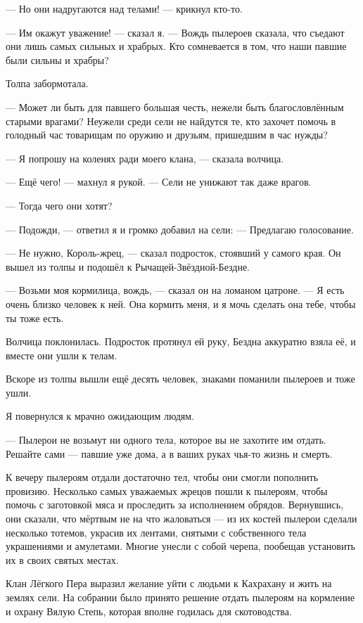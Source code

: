 --- Но они надругаются над телами! --- крикнул кто-то.

--- Им окажут уважение! --- сказал я.
--- Вождь пылероев сказала, что съедают они лишь самых сильных и храбрых.
Кто сомневается в том, что наши павшие были сильны и храбры?

Толпа забормотала.

--- Может ли быть для павшего большая честь, нежели быть благословлённым старыми врагами?
Неужели среди сели не найдутся те, кто захочет помочь в голодный час товарищам по оружию и друзьям, пришедшим в час нужды?

--- Я попрошу на коленях ради моего клана, --- сказала волчица.

--- Ещё чего! --- махнул я рукой.
--- Сели не унижают так даже врагов.

--- Тогда чего они хотят?

--- Подожди, --- ответил я и громко добавил на сели:
--- Предлагаю голосование.

--- Не нужно, Король-жрец, --- сказал подросток, стоявший у самого края.
Он вышел из толпы и подошёл к Рычащей-Звёздной-Бездне.

--- Возьми моя кормилица, вождь, --- сказал он на ломаном цатроне.
--- Я есть очень близко человек к ней.
Она кормить меня, и я мочь сделать она тебе, чтобы ты тоже есть.

Волчица поклонилась.
Подросток протянул ей руку, Бездна аккуратно взяла её, и вместе они ушли к телам.

Вскоре из толпы вышли ещё десять человек, знаками поманили пылероев и тоже ушли.

Я повернулся к мрачно ожидающим людям.

--- Пылерои не возьмут ни одного тела, которое вы не захотите им отдать.
Решайте сами --- павшие уже дома, а в ваших руках чья-то жизнь и смерть.

К вечеру пылероям отдали достаточно тел, чтобы они смогли пополнить провизию.
Несколько самых уважаемых жрецов пошли к пылероям, чтобы помочь с заготовкой мяса и проследить за исполнением обрядов.
Вернувшись, они сказали, что мёртвым не на что жаловаться --- из их костей пылерои сделали несколько тотемов, украсив их лентами, снятыми с собственного тела украшениями и амулетами.
Многие унесли с собой черепа, пообещав установить их в своих святых местах.

Клан Лёгкого Пера выразил желание уйти с людьми к Кахрахану и жить на землях сели.
На собрании было принято решение отдать пылероям на кормление и охрану Вялую Степь, которая вполне годилась для скотоводства.

